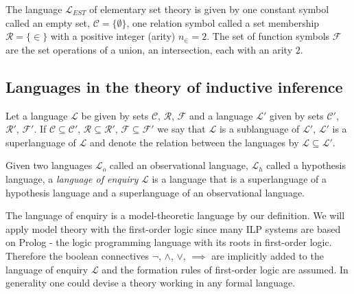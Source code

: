 \begin{exmp}
The language $\mathcal{L}_{EST}$ of elementary set theory is given by one constant symbol called an empty set, $\mathcal{C}=\{\emptyset\}$, one relation symbol called a set membership $\mathcal{R}=\{\in\}$ with a positive integer (arity) $n_{\in}=2$. The set of function symbols $\mathcal{F}$ are the set operations of a union, an intersection, each with an arity $2$.
\end{exmp}

\subsection{Languages in the theory of inductive inference}
\begin{defn}
Let a language $\mathcal{L}$ be given by sets $\mathcal{C}$, $\mathcal{R}$, $\mathcal{F}$ and a language $\mathcal{L}'$ given by sets $\mathcal{C}'$, $\mathcal{R}'$, $\mathcal{F}'$.
If $\mathcal{C} \subseteq \mathcal{C}'$, $\mathcal{R} \subseteq \mathcal{R}'$, $\mathcal{F} \subseteq \mathcal{F}'$ we say that $\mathcal{L}$ is a sublanguage of $\mathcal{L}'$, $\mathcal{L}'$ is a superlanguage of $\mathcal{L}$ and denote the relation between the languages by $\mathcal{L} \subseteq \mathcal{L}'$.
\end{defn}

\begin{defn}
Given two languages $\mathcal{L}_o$ called an observational language, $\mathcal{L}_h$ called a hypothesis language, a \emph{language of enquiry} $\mathcal{L}$ is a language that is a superlanguage of a hypothesis language and a superlanguage of an observational language.
\end{defn}

\begin{remark}
The language of enquiry is a model-theoretic language by our definition. We will apply model theory with the first-order logic since many ILP systems are based on Prolog - the logic programming language with its roots in first-order logic. Therefore the boolean connectives $\neg$, $\land$, $\lor$, $\implies$ are implicitly added to the language of enquiry $\mathcal{L}$ and the formation rules of first-order logic are assumed. In generality one could devise a theory working in any formal language.
\end{remark}

